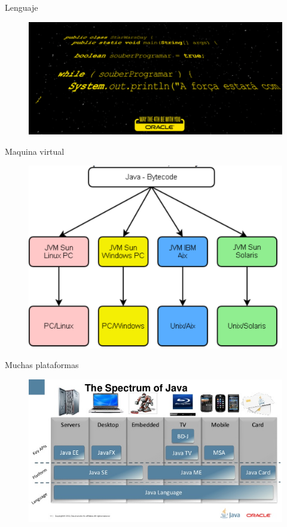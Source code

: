 \documentclass{beamer}
\begin{document}
\begin{frame}{Lenguaje}
\begin{figure}
\centering
\includegraphics[width=0.9\linewidth]{Images/javalang}
\end{figure}
\end{frame}

\begin{frame}{Maquina virtual}
\begin{figure}
\centering
\includegraphics[width=0.9\linewidth]{Images/jvm}
\end{figure}
\end{frame}

\begin{frame}{Muchas plataformas}
\begin{figure}
\centering
\includegraphics[width=0.9\linewidth]{Images/spectrum}
\end{figure}
\end{frame}
\end{document}
